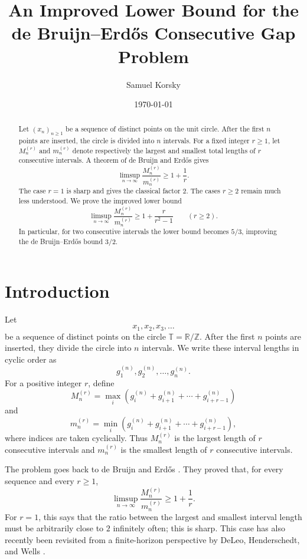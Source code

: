 \documentclass[11pt]{article}
\title{An Improved Lower Bound for the de Bruijn--Erd\H{o}s Consecutive Gap Problem}
\author{Samuel Korsky}
\date{\today}
\theoremstyle{remark}
\begin{document}
\maketitle

\begin{abstract}
\noindent
Let $(x_n)_{n\geq 1}$ be a sequence of distinct points on the unit circle. After the first $n$ points are inserted, the circle is divided into $n$ intervals. For a fixed integer $r\geq 1$, let $M_n^{(r)}$ and $m_n^{(r)}$ denote respectively the largest and smallest total lengths of $r$ consecutive intervals. A theorem of de Bruijn and Erd\H{o}s gives
\[
    \limsup_{n\to\infty}\frac{M_n^{(r)}}{m_n^{(r)}}\geq 1+\frac1r .
\]
The case $r=1$ is sharp and gives the classical factor $2$. The cases $r\geq 2$ remain much less understood. We prove the improved lower bound
\[
    \limsup_{n\to\infty}\frac{M_n^{(r)}}{m_n^{(r)}}
    \geq
    1+\frac{r}{r^2-1}
    \qquad (r\geq 2).
\]
In particular, for two consecutive intervals the lower bound becomes $5/3$, improving the de Bruijn--Erd\H{o}s bound $3/2$.
\end{abstract}

\section{Introduction}

Let
\[
    x_1,x_2,x_3,\ldots
\]
be a sequence of distinct points on the circle $\mathbb T=\mathbb R/\mathbb Z$. After the first $n$ points are inserted, they divide the circle into $n$ intervals. We write these interval lengths in cyclic order as
\[
    g_1^{(n)},g_2^{(n)},\ldots,g_n^{(n)}.
\]
For a positive integer $r$, define
\[
    M_n^{(r)}
    =
    \max_i\left(g_i^{(n)}+g_{i+1}^{(n)}+\cdots+g_{i+r-1}^{(n)}\right)
\]
and
\[
    m_n^{(r)}
    =
    \min_i\left(g_i^{(n)}+g_{i+1}^{(n)}+\cdots+g_{i+r-1}^{(n)}\right),
\]
where indices are taken cyclically. Thus $M_n^{(r)}$ is the largest length of $r$ consecutive intervals and $m_n^{(r)}$ is the smallest length of $r$ consecutive intervals.

\bigskip
\noindent
The problem goes back to de Bruijn and Erd\H{o}s \cite{debruijn-erdos}. They proved that, for every sequence and every $r\geq 1$,
\[
    \limsup_{n\to\infty}
    \frac{M_n^{(r)}}{m_n^{(r)}}
    \geq
    1+\frac1r .
\]
For $r=1$, this says that the ratio between the largest and smallest interval length must be arbitrarily close to $2$ infinitely often; this is sharp. This case has also recently been revisited from a finite-horizon perspective by DeLeo, Henderschedt, and Wells \cite{deleo-henderschedt-wells}. 
\end{document}
